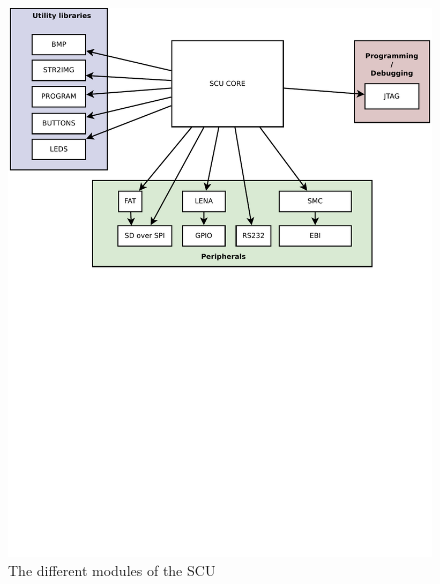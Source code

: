 \begin{figure}[H]
  \centering
  \includegraphics[width=\textwidth,clip,trim=0 14.5cm 0 0]{fig/avr/modules.pdf}
  \caption[SCU Modules]{The different modules of the SCU}
  \label{fig:avr-modules}
\end{figure}

